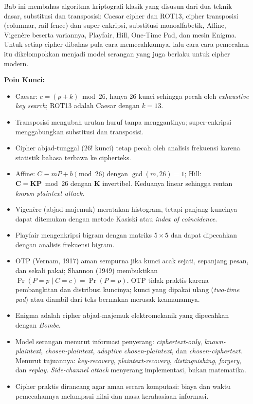 \documentclass[main.tex]{subfiles}
\begin{document}
\begin{rangkuman}
Bab ini membahas algoritma kriptografi klasik yang disusun dari dua teknik dasar, substitusi dan transposisi: Caesar cipher dan ROT13, cipher transposisi (columnar, rail fence) dan super-enkripsi, substitusi monoalfabetik, Affine, Vigen\`{e}re beserta variannya, Playfair, Hill, One-Time Pad, dan mesin Enigma. Untuk setiap cipher dibahas pula cara memecahkannya, lalu cara-cara pemecahan itu dikelompokkan menjadi model serangan yang juga berlaku untuk cipher modern.

\textbf{Poin Kunci:}
\begin{itemize}
  \item Caesar: $c = (p + k) \bmod 26$, hanya 26 kunci sehingga pecah oleh \textit{exhaustive key search}; ROT13 adalah Caesar dengan $k = 13$.
  \item Transposisi mengubah urutan huruf tanpa menggantinya; super-enkripsi menggabungkan substitusi dan transposisi.
  \item Cipher abjad-tunggal ($26!$ kunci) tetap pecah oleh analisis frekuensi karena statistik bahasa terbawa ke cipherteks.
  \item Affine: $C \equiv mP + b \pmod{26}$ dengan $\gcd(m, 26) = 1$; Hill: $\mathbf{C} = \mathbf{K}\mathbf{P} \bmod 26$ dengan $\mathbf{K}$ invertibel. Keduanya linear sehingga rentan \textit{known-plaintext attack}.
  \item Vigen\`{e}re (abjad-majemuk) meratakan histogram, tetapi panjang kuncinya dapat ditemukan dengan metode Kasiski atau \textit{index of coincidence}.
  \item Playfair mengenkripsi bigram dengan matriks $5 \times 5$ dan dapat dipecahkan dengan analisis frekuensi bigram.
  \item OTP (Vernam, 1917) aman sempurna jika kunci acak sejati, sepanjang pesan, dan sekali pakai; Shannon (1949) membuktikan $\Pr(P = p \mid C = c) = \Pr(P = p)$. OTP tidak praktis karena pembangkitan dan distribusi kuncinya; kunci yang dipakai ulang (\textit{two-time pad}) atau diambil dari teks bermakna merusak keamanannya.
  \item Enigma adalah cipher abjad-majemuk elektromekanik yang dipecahkan dengan \textit{Bombe}.
  \item Model serangan menurut informasi penyerang: \textit{ciphertext-only}, \textit{known-plaintext}, \textit{chosen-plaintext}, \textit{adaptive chosen-plaintext}, dan \textit{chosen-ciphertext}. Menurut tujuannya: \textit{key-recovery}, \textit{plaintext-recovery}, \textit{distinguishing}, \textit{forgery}, dan \textit{replay}. \textit{Side-channel attack} menyerang implementasi, bukan matematika.
  \item Cipher praktis dirancang agar aman secara komputasi: biaya dan waktu pemecahannya melampaui nilai dan masa kerahasiaan informasi.
\end{itemize}


\end{rangkuman}
\end{document}

